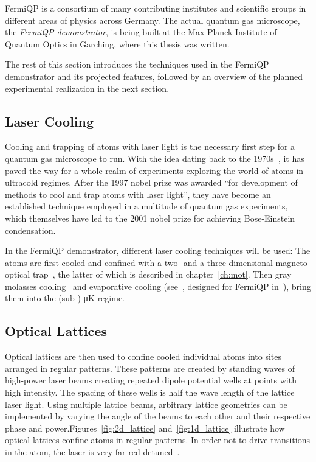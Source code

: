 FermiQP is a consortium of many contributing institutes and scientific groups in different areas of physics across Germany. The actual quantum gas microscope, the \textit{FermiQP demonstrator}, is being built at the Max Planck Institute of Quantum Optics in Garching, where this thesis was written.

The rest of this section introduces the techniques used in the FermiQP demonstrator and its projected features, followed by an overview of the planned experimental realization in the next section.

\subsection*{Laser Cooling}
Cooling and trapping of atoms with laser light is the necessary first step for a quantum gas microscope to run. With the idea dating back to the 1970s~\cite{hansch_cooling_1975}, it has paved the way for a whole realm of experiments exploring the world of atoms in ultracold regimes. After the 1997 nobel prize was awarded ``for development of methods to cool and trap atoms with laser light'', they have become an established technique employed in a multitude of quantum gas experiments, which themselves have led to the 2001 nobel prize for achieving Bose-Einstein condensation.

In the FermiQP demonstrator, different laser cooling techniques will be used: The atoms are first cooled and confined with a two- and a three-dimensional magneto-optical trap~\cite{foot_atomic_2005}, the latter of which is described in chapter~\ref{ch:mot}. Then gray molasses cooling~\cite{weidemuller_novel_1994} and evaporative cooling (see~\cite{foot_atomic_2005}, designed for FermiQP in~\cite{sun_construction_2022}), bring them into the (sub-) \si[]{\micro\kelvin} regime.

\subsection*{Optical Lattices}
Optical lattices are then used to confine cooled individual atoms into sites arranged in regular patterns. These patterns are created by standing waves of high-power laser beams creating repeated dipole potential wells at points with high intensity. The spacing of these wells is half the wave length of the lattice laser light. Using multiple lattice beams, arbitrary lattice geometries can be implemented by varying the angle of the beams to each other and their respective phase and power.Figures~\ref{fig:2d_lattice} and~\ref{fig:1d_lattice} illustrate how optical lattices confine atoms in regular patterns. In order not to drive transitions in the atom, the laser is very far red-detuned~\cite{bloch_many-body_2008, bloch_quantum_2012}.

